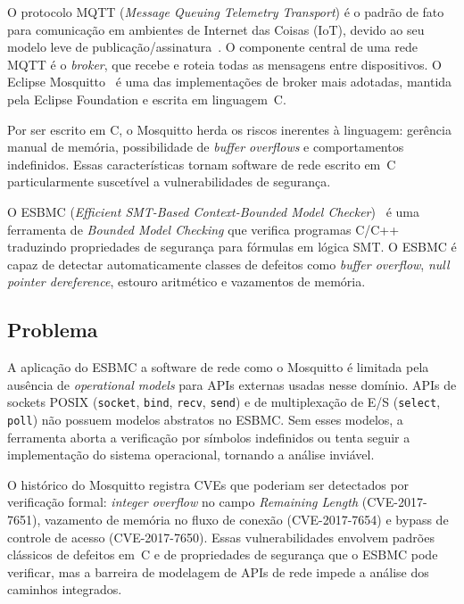 \documentclass[conference]{IEEEtran}
\begin{document}
O protocolo MQTT (\emph{Message Queuing Telemetry Transport}) \'e o padr\~ao de fato para comunica\c{c}\~ao em ambientes de Internet das Coisas (IoT), devido ao seu modelo leve de publica\c{c}\~ao/assinatura~\cite{mqtt_v5_spec}. O componente central de uma rede MQTT \'e o \emph{broker}, que recebe e roteia todas as mensagens entre dispositivos. O Eclipse Mosquitto~\cite{mosquitto} \'e uma das implementa\c{c}\~oes de broker mais adotadas, mantida pela Eclipse Foundation e escrita em linguagem~C.

Por ser escrito em C, o Mosquitto herda os riscos inerentes \`a linguagem: ger\^encia manual de mem\'oria, possibilidade de \emph{buffer overflows} e comportamentos indefinidos. Essas caracter\'isticas tornam software de rede escrito em~C particularmente suscet\'ivel a vulnerabilidades de seguran\c{c}a.

O ESBMC (\emph{Efficient SMT-Based Context-Bounded Model Checker})~\cite{cordeiro2012tse} \'e uma ferramenta de \emph{Bounded Model Checking} que verifica programas C/C++ traduzindo propriedades de seguran\c{c}a para f\'ormulas em l\'ogica SMT. O ESBMC \'e capaz de detectar automaticamente classes de defeitos como \emph{buffer overflow}, \emph{null pointer dereference}, estouro aritm\'etico e vazamentos de mem\'oria.

\subsection{Problema}
\label{sec:problema}

A aplica\c{c}\~ao do ESBMC a software de rede como o Mosquitto \'e limitada pela aus\^encia de \emph{operational models} para APIs externas usadas nesse dom\'inio. APIs de sockets POSIX (\texttt{socket}, \texttt{bind}, \texttt{recv}, \texttt{send}) e de multiplexa\c{c}\~ao de E/S (\texttt{select}, \texttt{poll}) n\~ao possuem modelos abstratos no ESBMC. Sem esses modelos, a ferramenta aborta a verifica\c{c}\~ao por s\'imbolos indefinidos ou tenta seguir a implementa\c{c}\~ao do sistema operacional, tornando a an\'alise invi\'avel.

O hist\'orico do Mosquitto registra CVEs que poderiam ser detectados por
verifica\c{c}\~ao formal: \emph{integer overflow} no campo \emph{Remaining Length}
(CVE-2017-7651), vazamento de mem\'oria no fluxo de conex\~ao (CVE-2017-7654) e
bypass de controle de acesso (CVE-2017-7650). Essas vulnerabilidades envolvem
padr\~oes cl\'assicos de defeitos em~C e de propriedades de seguran\c{c}a que o
ESBMC pode verificar, mas a barreira de modelagem de APIs de rede impede a
an\'alise dos caminhos integrados.
\end{document}
